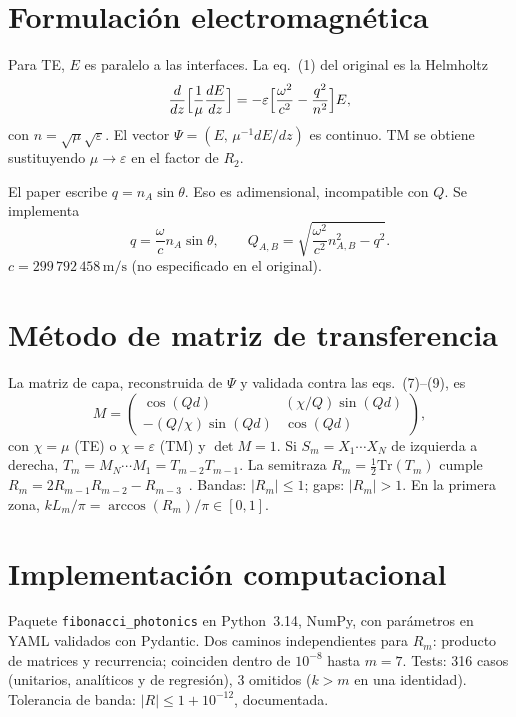 \documentclass[11pt,a4paper]{article}
\begin{document}
\section{Formulación electromagnética}

Para TE, $E$ es paralelo a las interfaces. La eq.~(1) del original es la Helmholtz
\begin{equation}
\frac{d}{dz}\Bigl[\frac{1}{\mu}\frac{dE}{dz}\Bigr]
=-\varepsilon\Bigl[\frac{\omega^2}{c^2}-\frac{q^2}{n^2}\Bigr]E,
\end{equation}
con $n=\sqrt{\mu}\sqrt{\varepsilon}$. El vector
$\Psi=(E,\,\mu^{-1}dE/dz)$ es continuo.
TM se obtiene sustituyendo $\mu\to\varepsilon$ en el factor de $R_2$.

El paper escribe $q=n_A\sin\theta$. Eso es adimensional, incompatible con $Q$.
Se implementa
\begin{equation}
q=\frac{\omega}{c}n_A\sin\theta,
\qquad
Q_{A,B}=\sqrt{\frac{\omega^2}{c^2}n_{A,B}^2-q^2}.
\end{equation}
$c=299\,792\,458\,\mathrm{m/s}$ (no especificado en el original).

\section{Método de matriz de transferencia}

La matriz de capa, reconstruida de $\Psi$ y validada contra las eqs.~(7)--(9), es
\begin{equation}
M=\begin{pmatrix}
\cos(Qd) & (\chi/Q)\sin(Qd)\\
-(Q/\chi)\sin(Qd) & \cos(Qd)
\end{pmatrix},
\end{equation}
con $\chi=\mu$ (TE) o $\chi=\varepsilon$ (TM) y $\det M=1$.
Si $S_m=X_1\cdots X_N$ de izquierda a derecha,
$T_m=M_N\cdots M_1=T_{m-2}T_{m-1}$.
La semitraza $R_m=\frac12\mathrm{Tr}(T_m)$ cumple
$R_m=2R_{m-1}R_{m-2}-R_{m-3}$~\cite{Kohmoto1983}.
Bandas: $\lvert R_m\rvert\le 1$; gaps: $\lvert R_m\rvert>1$.
En la primera zona, $kL_m/\pi=\arccos(R_m)/\pi\in[0,1]$.

\section{Implementación computacional}

Paquete \texttt{fibonacci\_photonics} en Python~3.14, NumPy, con parámetros en YAML validados con Pydantic.
Dos caminos independientes para $R_m$: producto de matrices y recurrencia; coinciden
dentro de $10^{-8}$ hasta $m=7$. Tests: 316 casos (unitarios, analíticos y de regresión), 3 omitidos ($k>m$ en una identidad).
Tolerancia de banda: $\lvert R\rvert\le 1+10^{-12}$, documentada.
\end{document}
